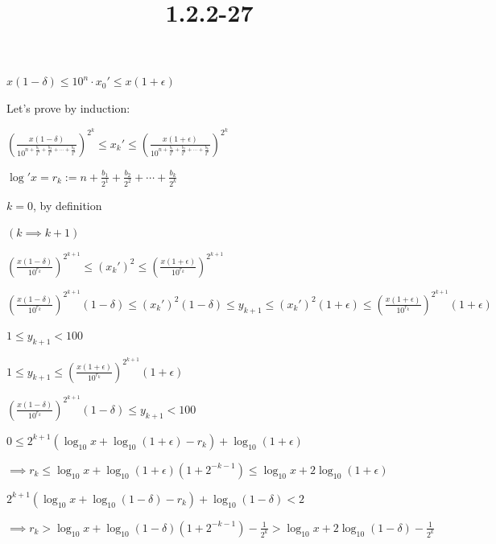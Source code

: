 \documentclass{article}
\title{1.2.2-27}
\begin{document}
\maketitle

\( x(1-\delta) \leq 10^n\cdot x_0' \leq x(1+\epsilon) \)

Let's prove by induction:

\( (\frac{x(1-\delta)}{10^{n+\frac{b_1}{2^1}+\frac{b_2}{2^2}+\cdots+\frac{b_k}{2^k}}})^{2^k} \leq x_k' \leq (\frac{x(1+\epsilon)}{10^{n+\frac{b_1}{2^1}+\frac{b_2}{2^2}+\cdots+\frac{b_k}{2^k}}})^{2^k} \)

\( \log'{x} = r_k:= n+\frac{b_1}{2^1}+\frac{b_2}{2^2}+\cdots+\frac{b_k}{2^k} \)

\( k = 0 \), by definition

\( (k \implies k + 1) \)

\( (\frac{x(1-\delta)}{10^{r_k}})^{2^{k+1}} \leq (x_k')^2 \leq (\frac{x(1+\epsilon)}{10^{r_k}})^{2^{k+1}} \)

\( (\frac{x(1-\delta)}{10^{r_k}})^{2^{k+1}} (1-\delta) \leq (x_k')^2 (1-\delta) \leq y_{k+1} \leq (x_k')^2 (1+\epsilon) \leq (\frac{x(1+\epsilon)}{10^{r_k}})^{2^{k+1}} (1+\epsilon) \)

\( 1 \leq y_{k+1} < 100 \)

\( 1 \leq y_{k+1} \leq (\frac{x(1+\epsilon)}{10^{r_k}})^{2^{k+1}} (1+\epsilon) \)

\( (\frac{x(1-\delta)}{10^{r_k}})^{2^{k+1}} (1-\delta) \leq y_{k+1} < 100 \)

\( 0 \leq 2^{k+1} (\log_{10}{x} + \log_{10}{(1+\epsilon)} - r_k) + \log_{10}{(1+\epsilon)} \)

\( \implies r_k \leq \log_{10}{x} + \log_{10}{(1+\epsilon)}(1+2^{-k-1}) \leq \log_{10}{x} + 2\log_{10}{(1+\epsilon)} \)

\( 2^{k+1} (\log_{10}{x} + \log_{10}{(1-\delta)} - r_k) + \log_{10}{(1-\delta)} < 2 \)

\( \implies r_k > \log_{10}{x} + \log_{10}{(1-\delta)}(1+2^{-k-1}) - \frac{1}{2^k} > \log_{10}{x} + 2\log_{10}(1-\delta) - \frac{1}{2^k} \)
\end{document}
